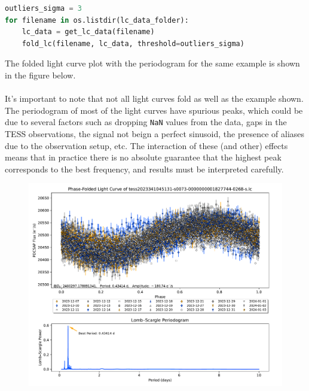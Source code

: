 \documentclass[a4paper,12pt]{article}
\DeclareRobustCommand{\bold}{\fontseries{b}\selectfont}
\newcommand{\bcode}[1]{\texttt{\fontsize{11}{13}\selectfont\bold#1}}
\newenvironment{solution}{}{}
\begin{document}
\begin{enumerate}
\begin{solution}
\begin{lstlisting}[language=python]
outliers_sigma = 3
for filename in os.listdir(lc_data_folder):
    lc_data = get_lc_data(filename)
    fold_lc(filename, lc_data, threshold=outliers_sigma)\end{lstlisting}
  \vspace{1em} The folded light curve plot with the periodogram for the same
  example is shown in the figure below.
  \\\\It's important to note that not all light curves fold as well as the example
  shown. The periodogram of most of the light curves have spurious peaks, which
  could be due to several factors such as dropping \bcode{NaN} values from the data,
  gaps in the TESS observations, the signal not beign a perfect sinusoid, the
  presence of aliases due to the observation setup, etc. The interaction of these
  (and other) effects means that in practice there is no absolute guarantee that
  the highest peak corresponds to the best frequency, and results must be
  interpreted carefully.\pagebreak
  \begin{figure}[htbp]
    \centering
    \hspace{5mm}\includegraphics[width = 1\textwidth]{
      ../Plots/tess2023341045131-s0073-0000000001827744-0268-s.lc_folded.pdf}
  \end{figure}
  \end{solution}
\end{enumerate}
\end{document}
